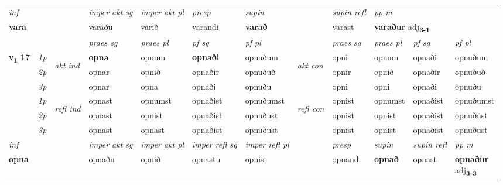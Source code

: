 \begin{longtable}[l]{X>{\footnotesize\itshape}llXXXXlXXXX}
   {\textit{inf}} & &  & \textit{imper akt sg} & \textit{imper akt pl}   & \textit{presp} & \textit{supin} && \textit{supin refl} & \textit{pp m} \\*
  {\textbf{vara}} & && varaðu  & varið   & varandi &  \textbf{varað} && varast & \multicolumn{2}{l}{\textbf{varaður} adj\textbf{\textsubscript{3-1}}} \\*

\midrule

 & &   & \textit{praes sg}  & \textit{praes pl}    & \textit{ pf sg} & \textit{pf pl} & & \textit{praes sg}  & \textit{praes pl}    & \textit{pf sg} & \textit{pf pl }  \\ \cmidrule{4-7} \cmidrule{9-12}
 \multirow{2}{*}{{{\textbf{v{\textsubscript{1}}} \Large{\textbf{17}}}}}  & 1p & \multirow{3}{*}{\begin{turn}{90}\textit{akt ind}\end{turn}} & \textbf{opna} & opnum & \textbf{opnaði} & opnuðum & \multirow{3}{*}{\begin{turn}{90}\textit{akt con}\end{turn}} &opni & opnum & opnaði & opnuðum\\*
 & 2p &  &  opnar  & opnið & opnaðir & opnuðuð & & opnir & opnið & opnaðir & opnuðuð \\*
 & 3p &  & opnar & opna & opnaði & opnuðu & & opni & opni& opnaði & opnuðu \\*
\cmidrule{4-7} \cmidrule{9-12}
 & 1p & \multirow{3}{*}{\begin{turn}{90}\textit{refl ind}\end{turn}}  & opnast & opnumst & opnaðist & opnuðumst & \multirow{3}{*}{\begin{turn}{90}\textit{refl con}\end{turn}}  &opnist & opnumst & opnaðist & opnuðumst \\*
 & 2p &  & opnast & opnist & opnaðist & opnuðust & &opnist & opnist & opnaðist & opnuðust \\*
 & 3p  & & opnast & opnast & opnaðist & opnuðust & & opnist & opnist& opnaðist & opnuðust \\*
\cmidrule{4-7} \cmidrule{9-12}

   {\textit{inf}} & &  & \textit{imper akt sg} & \textit{imper akt pl} & \textit{imper refl sg} & \textit{imper refl pl} && \textit{presp} & \textit{supin} & \textit{supin refl} & \textit{pp m} \\*
  {\textbf{opna}} & && opnaðu  & opnið & opnastu & opnist && opnandi &  \textbf{opnað} & opnast & \specialcell{\textbf{opnaður} \\ adj\textbf{\textsubscript{3-3}}} \\*


\end{longtable}
